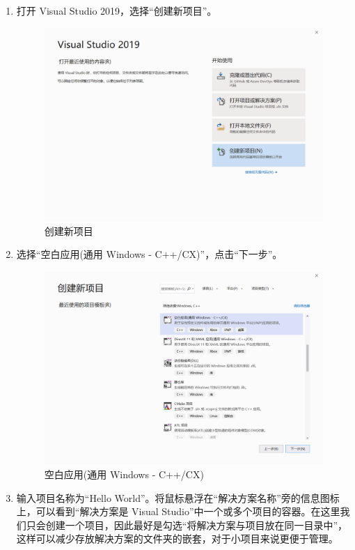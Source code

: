 \begin{enumerate}
    \item 打开 Visual Studio 2019，选择``创建新项目''。
    \begin{figure}[htbp]
        \centering
        \includegraphics[width = 0.5\paperwidth]{pic/2.png}
        \caption{创建新项目}
    \end{figure}

    \item 选择``空白应用(通用 Windows - C++/CX)''，点击``下一步''。
    \begin{figure}[htbp]
        \centering
        \includegraphics[width = 0.5\paperwidth]{pic/3.png}
        \caption{空白应用(通用 Windows - C++/CX)}
    \end{figure}

    \item 输入项目名称为``Hello World''。将鼠标悬浮在``解决方案名称''旁的信息图标上，可以看到``解决方案是 Visual Studio''中一个或多个项目的容器。在这里我们只会创建一个项目，因此最好是勾选``将解决方案与项目放在同一目录中''，这样可以减少存放解决方案的文件夹的嵌套，对于小项目来说更便于管理。


\end{enumerate}
